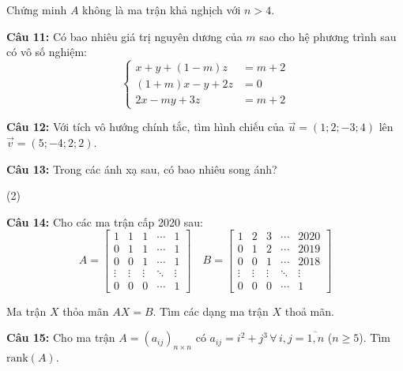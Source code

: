 \documentclass[12pt, a4paper]{article}
\begin{document}
    Chứng minh $A$ không là ma trận khả nghịch với $n > 4$.
    \vspace{30pt}

    \textbf{Câu 11:} Có bao nhiêu giá trị nguyên dương của $m$ sao cho hệ phương trình sau có vô số nghiệm:
    $$ \begin{cases}
        x + y + (1 - m)z & = m + 2 \\
        (1 + m)x - y + 2z & = 0 \\
        2x - my + 3z & = m + 2
    \end{cases} $$

    \textbf{Câu 12:} Với tích vô hướng chính tắc, tìm hình chiếu của $\overrightarrow{u} = (1; 2; -3; 4)$ lên $\overrightarrow{v} = (5; -4; 2; 2)$.

    \textbf{Câu 13:} Trong các ánh xạ sau, có bao nhiêu song ánh?
    \begin{tasks}[label=\textbullet](2)
        \task {}
        \task {}
        \task {}
        \task \fullfunction{f}{[1; +\infty)}{[-5; +\infty)}{x}{x^2 - 2x - 4}
    \end{tasks}

    \textbf{Câu 14:} Cho các ma trận cấp 2020 sau:
    $$A = \begin{bmatrix}
        1 & 1 & 1 & \cdots & 1 \\
        0 & 1 & 1 & \cdots & 1 \\
        0 & 0 & 1 & \cdots & 1 \\
        \vdots & \vdots & \vdots & \ddots & \vdots \\
        0 & 0 & 0 & \cdots & 1
    \end{bmatrix} \quad B = \begin{bmatrix}
        1 & 2 & 3 & \cdots & 2020 \\
        0 & 1 & 2 & \cdots & 2019 \\
        0 & 0 & 1 & \cdots & 2018 \\
        \vdots & \vdots & \vdots & \ddots & \vdots \\
        0 & 0 & 0 & \cdots & 1
    \end{bmatrix}$$

    Ma trận $X$ thỏa mãn $AX = B$. Tìm các dạng ma trận $X$ thoả mãn.

    \vspace{10pt}

    \textbf{Câu 15:} Cho ma trận $A = \left(a_{ij}\right)_{n \times n}$ có $a_{ij} = i^2 + j^3 \, \forall \, i, j = \overline{1, n}$ ($n \geq 5$). Tìm $\text{rank}(A)$.
\end{document}
